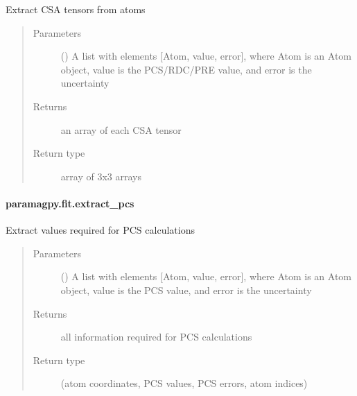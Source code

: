 \documentclass[a4paper,10pt,english]{sphinxmanual}
\begin{document}
\begin{fulllineitems}
\label{\detokenize{reference/generated/paramagpy.fit.extract_csa:paramagpy.fit.extract_csa}}
Extract CSA tensors from atoms
\begin{quote}\begin{description}
\item[{Parameters}] \leavevmode
{} () \textendash{} A list with elements {[}Atom, value, error{]}, where Atom is
an Atom object, value is the PCS/RDC/PRE value,
and error is the uncertainty

\item[{Returns}] \leavevmode
{} \textendash{} an array of each CSA tensor

\item[{Return type}] \leavevmode
array of 3x3 arrays

\end{description}\end{quote}

\end{fulllineitems}



\paragraph{paramagpy.fit.extract\_pcs}
\label{\detokenize{reference/generated/paramagpy.fit.extract_pcs:paramagpy-fit-extract-pcs}}\label{\detokenize{reference/generated/paramagpy.fit.extract_pcs::doc}}

\begin{fulllineitems}
\label{\detokenize{reference/generated/paramagpy.fit.extract_pcs:paramagpy.fit.extract_pcs}}
Extract values required for PCS calculations
\begin{quote}\begin{description}
\item[{Parameters}] \leavevmode
{} () \textendash{} A list with elements {[}Atom, value, error{]}, where Atom is
an Atom object, value is the PCS value, and error is the uncertainty

\item[{Returns}] \leavevmode
{} \textendash{} all information required for PCS calculations

\item[{Return type}] \leavevmode
(atom coordinates, PCS values, PCS errors, atom indices)

\end{description}\end{quote}

\end{fulllineitems}
\end{document}
